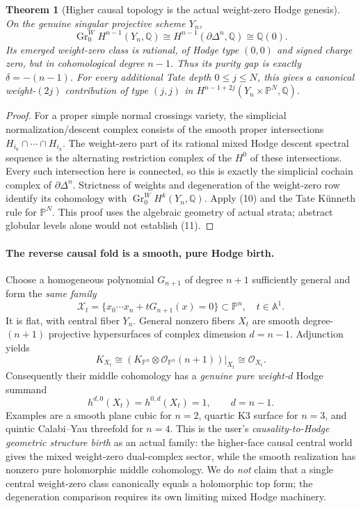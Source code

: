 \documentclass[11pt]{article}
\newtheorem{theorem}{Theorem}
\begin{document}
\begin{theorem}[Higher causal topology is the actual weight-zero Hodge genesis]
On the \emph{genuine} singular projective scheme $Y_n$,
\[
\boxed{\quad
 \operatorname{Gr}^W_0 H^{n-1}(Y_n,\mathbb Q)
 \cong H^{n-1}(\partial\Delta^n,\mathbb Q)
 \cong\mathbb Q(0).
 \quad}\tag{11}
\]
Its emerged weight-zero class is rational, of Hodge type
$(0,0)$ and signed charge zero, but in cohomological degree
$n-1$. Thus its purity gap is exactly $\delta=-(n-1)$.
For every additional Tate depth $0\le j\le N$, this gives
a canonical weight-$(2j)$ contribution of type $(j,j)$
in $H^{n-1+2j}(Y_n\times\mathbb P^N,\mathbb Q)$.
\end{theorem}
\begin{proof}
For a proper simple normal crossings variety, the
simplicial normalization/descent complex consists of the
smooth proper intersections $H_{i_0}\cap\cdots\cap H_{i_k}$.
The weight-zero part of its rational mixed Hodge descent
spectral sequence is the alternating restriction complex
of the $H^0$ of these intersections. Every such intersection
here is connected, so this is exactly the simplicial
cochain complex of $\partial\Delta^n$. Strictness of weights
and degeneration of the weight-zero row identify its
cohomology with $\operatorname{Gr}^W_0 H^k(Y_n,\mathbb Q)$.
Apply (10) and the Tate K\"unneth rule for $\mathbb P^N$.
This proof uses the algebraic geometry of actual strata;
abstract globular levels alone would not establish (11).
\end{proof}

\paragraph{The reverse causal fold is a smooth, pure Hodge birth.}
Choose a homogeneous polynomial $G_{n+1}$ of degree $n+1$
sufficiently general and form the \emph{same family}
\[
\boxed{\quad
 \mathscr X_t=\bigl\{x_0\cdots x_n+tG_{n+1}(x)=0\bigr\}
  \subset\mathbb P^n,\quad t\in\mathbb A^1.
\quad}\tag{12}
\]
It is flat, with central fiber $Y_n$. General nonzero fibers
$X_t$ are smooth degree-$(n+1)$ projective hypersurfaces
of complex dimension $d=n-1$. Adjunction yields
\[
K_{X_t}\cong
(K_{\mathbb P^n}\otimes\mathcal O_{\mathbb P^n}(n+1))|_{X_t}
\cong\mathcal O_{X_t}.
\]
Consequently their middle cohomology has a \emph{genuine
pure weight-$d$} Hodge summand
\[
\boxed{\quad h^{d,0}(X_t)=h^{0,d}(X_t)=1,\qquad d=n-1.\quad}\tag{13}
\]
Examples are a smooth plane cubic for $n=2$, quartic K3
surface for $n=3$, and quintic Calabi--Yau threefold
for $n=4$. This is the user's \emph{causality-to-Hodge
geometric structure birth} as an actual family:
the higher-face causal central world gives the
mixed weight-zero dual-complex sector, while the
smooth realization has nonzero pure holomorphic middle
cohomology. We do \emph{not} claim that a single
central weight-zero class canonically equals
a holomorphic top form; the degeneration comparison
requires its own limiting mixed Hodge machinery.
\end{document}
